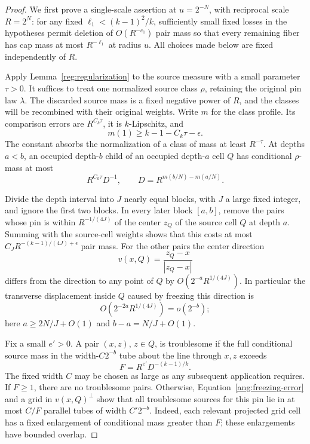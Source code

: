 \begin{proof}
We first prove a single-scale assertion at $u=2^{-N}$, with reciprocal
scale $R=2^N$: for any fixed $\ell_1<(k-1)^2/k$, sufficiently small
fixed losses in the hypotheses permit deletion of $O(R^{-c_1})$ pair
mass so that every remaining fiber has cap mass at most $R^{-\ell_1}$
at radius $u$. All choices made below are fixed independently of $R$.

Apply Lemma~\ref{reg:regularization} to the source measure with a small
parameter $\tau>0$. It suffices to treat one normalized source class
$\rho$, retaining the original pin law $\lambda$. The discarded source
mass is a fixed negative power of $R$, and the classes will be recombined
with their original weights. Write $m$ for the class profile. Its
comparison errors are $R^{C_k\tau}$, it is $k$-Lipschitz, and
\[
 m(1)\ge k-1-C_k\tau-\epsilon.
\]
The constant absorbs the normalization of a class of mass at least
$R^{-\tau}$. At depths $a<b$, an occupied depth-$b$ child of an
occupied depth-$a$ cell $Q$ has conditional $\rho$-mass at most
\begin{equation}\label{ang:conditional-child}
 R^{C_k\tau}D^{-1},\qquad
 D=R^{m(b/N)-m(a/N)}.
\end{equation}

Divide the depth interval into $J$ nearly equal blocks, with $J$ a
large fixed integer, and ignore the first two blocks. In every later
block $[a,b]$, remove the pairs whose pin is within $R^{-1/(4J)}$ of
the center $z_Q$ of the source cell $Q$ at depth $a$. Summing with the
source-cell weights shows that this costs at most
$C_JR^{-(k-1)/(4J)+\epsilon}$ pair mass. For the other pairs the center
direction
\[
 v(x,Q)=\frac{z_Q-x}{|z_Q-x|}
\]
differs from the direction to any point of $Q$ by
$O(2^{-a}R^{1/(4J)})$. In particular the transverse displacement inside
$Q$ caused by freezing this direction is
\begin{equation}\label{ang:freezing-error}
 O(2^{-2a}R^{1/(4J)})=o(2^{-b});
\end{equation}
here $a\ge2N/J+O(1)$ and $b-a=N/J+O(1)$.

Fix a small $e'>0$. A pair $(x,z)$, $z\in Q$, is troublesome if the
full conditional source mass in the width-$C2^{-b}$ tube about the
line through $x,z$ exceeds
\begin{equation}\label{ang:local-fraction}
 F=R^{e'}D^{-(k-1)/k}.
\end{equation}
The fixed width $C$ may be chosen as large as any subsequent application
requires. If $F\ge1$, there are no troublesome pairs. Otherwise,
Equation~\eqref{ang:freezing-error} and a grid in $v(x,Q)^\perp$ show
that all troublesome sources for this pin lie in at most $C/F$
parallel tubes of width $C'2^{-b}$. Indeed, each relevant projected grid
cell has a fixed enlargement of conditional mass greater than $F$;
these enlargements have bounded overlap.


\end{proof}
